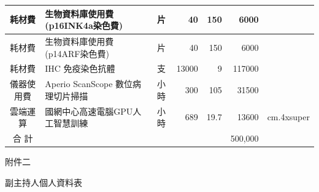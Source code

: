 \documentclass[12pt, a4paper]{article}
\begin{document}
\begin{CJK*}{UTF8}{bkai}
\begin{table}[hp]
{\begin{tabular}{|c|l|c|r|r|r|r|}
耗材費    & 生物資料庫使用費(p16INK4a染色費)           & 片  & 40                      & 150                      & 6000                    &                                                                      \\ \hline
耗材費    & 生物資料庫使用費(p14ARF染色費)           & 片  & 40                      & 150                      & 6000                    &                                                                      \\ \hline
耗材費    & IHC 免疫染色抗體           & 支  & 13000                     & 9                      & 117000                    &                                                                      \\ \hline

儀器使用費  & Aperio ScanScope 數位病理切片掃描 & 小時 & 300                      & 105                    & 31500                   &                                                                      \\ \hline
雲端運算   & 國網中心高速電腦GPU人工智慧訓練         & 小時 & 689                      & 19.7                 & 13600                 & cm.4xsuper                                                           \\ \hline
合 計    &                           &    &                         &                         & 500,000                 &                                                                      \\ \hline
\end{tabular}%
}
\end{table}


\clearpage
附件二\\
\begin{center}
副主持人個人資料表\\
\end{center}


\end{CJK*}
\end{document}

